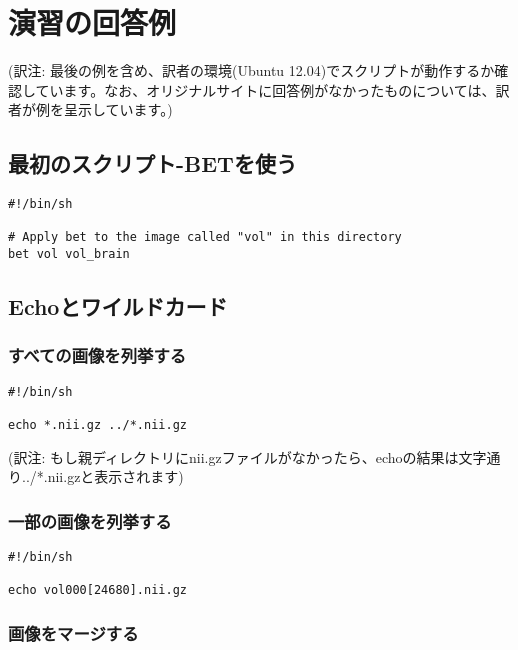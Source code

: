 \documentclass{jsarticle}
\begin{document}
\newpage


\appendix

\section{演習の回答例}

\noindent (訳注: 最後の例を含め、訳者の環境(Ubuntu 12.04)でスクリプトが動作するか確認しています。なお、オリジナルサイトに回答例がなかったものについては、訳者が例を呈示しています。)

\subsection{最初のスクリプト-BETを使う}

\begin{verbatim}
#!/bin/sh

# Apply bet to the image called "vol" in this directory
bet vol vol_brain
\end{verbatim}

\subsection{Echoとワイルドカード}

\subsubsection{すべての画像を列挙する}

\begin{verbatim}
#!/bin/sh

echo *.nii.gz ../*.nii.gz
\end{verbatim}

\noindent (訳注: もし親ディレクトリにnii.gzファイルがなかったら、echoの結果は文字通り../*.nii.gzと表示されます)

\subsubsection{一部の画像を列挙する}

\begin{verbatim}
#!/bin/sh

echo vol000[24680].nii.gz
\end{verbatim}

\subsubsection{画像をマージする}
\end{document}
